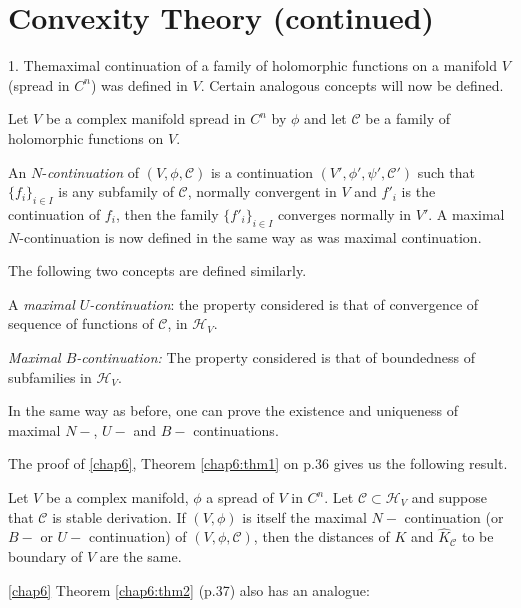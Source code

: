 
\chapter{Convexity Theory (continued)}\label{chap7}

1. The\pageoriginale maximal continuation of a family of holomorphic
functions on a manifold $V$ (spread in $C^n$) was defined in
$V$. Certain analogous concepts will now be defined.

Let $V$ be a complex manifold spread in $C^n$ by $\phi$ and let
$\mathscr{C}$ be a family of holomorphic functions on $V$. 

An $N$-\textit{continuation} of $(V, \phi, \mathscr{C})$ is a
continuation $(V', \phi', \psi', \mathscr{C}')$ such that $\{f_i\}_{i
  \in I}$ is any subfamily of $\mathscr{C}$, normally convergent in
$V$ and $f'_i$ is the continuation of $f_i$, then the family
$\{f'_i\}_{i \in I}$ converges normally in $V'$. A maximal
$N$-continuation is now defined in the same way as was maximal
continuation. 

The following two concepts are defined similarly.

A \textit{maximal $U$-continuation}: the property considered is that
of convergence of sequence of functions of $\mathscr{C}$, in
$\mathscr{H}_V$.

\textit{Maximal $B$-continuation:} The property considered is that of
boundedness of subfamilies in $\mathscr{H}_V$. 

In the same way as before, one can prove the existence and uniqueness
of maximal $N-$, $U-$ and $B-$ continuations.

The proof of \ref{chap6}, Theorem \ref{chap6:thm1} on p.36 gives us
the following result.  


\begin{dashthm}\label{chap7:dashthm1}
Let $V$ be a complex manifold, $\phi$ a spread of $V$ in
  $C^n$. Let $\mathscr{C} \subset \mathscr{H}_V$ and suppose that
  $\mathscr{C}$ is stable derivation. If $(V, \phi)$ is itself the
  maximal $N-$ continuation (or $B-$ or $U-$ continuation) of $(V, \phi,
  \mathscr{C})$, then the distances of $K$ and $\hat{K}_{\mathscr{C}}$
to be boundary of $V$ are the same.
\end{dashthm}

\ref{chap6} Theorem \ref{chap6:thm2} \pageoriginale (p.37) also has an analogue:

